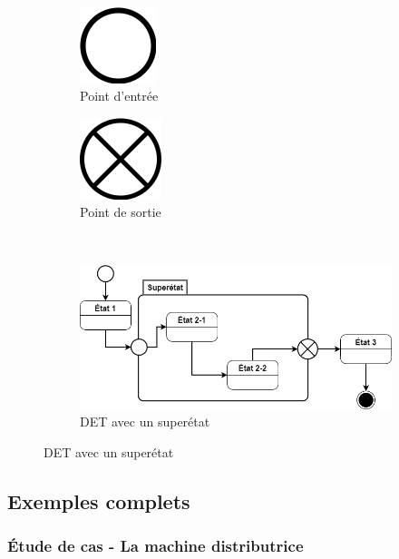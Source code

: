 \begin{figure}[H]
	\caption{Représentation des états spéciaux  et  dans un superétat de \acrshort{DET}}
	\centering
	~ 
	\hfill
	\begin{subfigure}[b]{0.3\textwidth}
		\centering
		\includegraphics[scale=0.4]{entre-superetat.png}
		\caption*{Point d'entrée}
	\end{subfigure}
	\begin{subfigure}[b]{0.3\textwidth}
		\centering
		\includegraphics[scale=0.4]{sortie-superetat.png}
		\caption*{Point de sortie}
	\end{subfigure}
	\hfill
	~
	\\
	\begin{subfigure}[b]{\textwidth}
		\centering
		\includegraphics[scale=0.6]{exemple-complet.png}
		\caption*{DET avec un superétat}
	\end{subfigure}
\end{figure}

\subsection{Exemples complets}

\subsubsection{Étude de cas - La machine distributrice}


